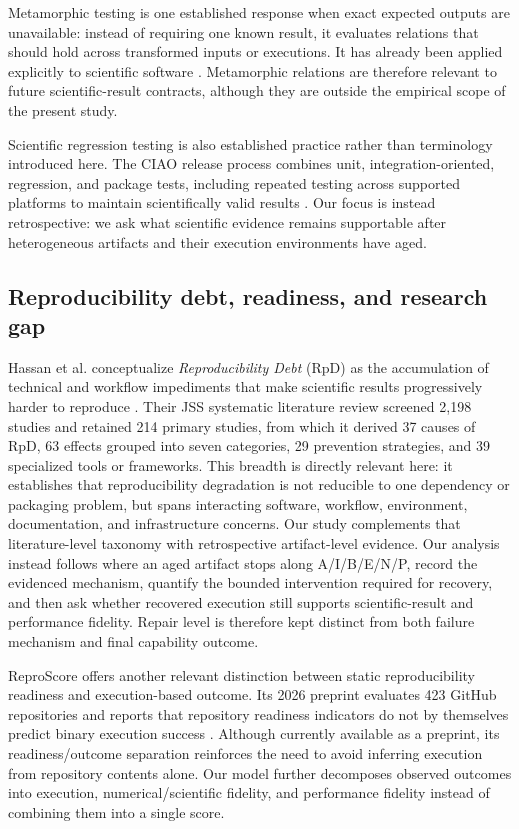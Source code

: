 \documentclass[a4paper,fleqn]{cas-dc}
\begin{document}
Metamorphic testing is one established response when exact expected outputs are unavailable: instead of requiring one known result, it evaluates relations that should hold across transformed inputs or executions. It has already been applied explicitly to scientific software \citep{ding2016metamorphic}. Metamorphic relations are therefore relevant to future scientific-result contracts, although they are outside the empirical scope of the present study.

Scientific regression testing is also established practice rather than terminology introduced here. The CIAO release process combines unit, integration-oriented, regression, and package tests, including repeated testing across supported platforms to maintain scientifically valid results \citep{lee2011ciao}. Our focus is instead retrospective: we ask what scientific evidence remains supportable after heterogeneous artifacts and their execution environments have aged.

\subsection{Reproducibility debt, readiness, and research gap}

Hassan et al. conceptualize \emph{Reproducibility Debt} (RpD) as the accumulation of technical and workflow impediments that make scientific results progressively harder to reproduce \citep{hassan2025debt}. Their JSS systematic literature review screened 2,198 studies and retained 214 primary studies, from which it derived 37 causes of RpD, 63 effects grouped into seven categories, 29 prevention strategies, and 39 specialized tools or frameworks. This breadth is directly relevant here: it establishes that reproducibility degradation is not reducible to one dependency or packaging problem, but spans interacting software, workflow, environment, documentation, and infrastructure concerns. Our study complements that literature-level taxonomy with retrospective artifact-level evidence. Our analysis instead follows where an aged artifact stops along A/I/B/E/N/P, record the evidenced mechanism, quantify the bounded intervention required for recovery, and then ask whether recovered execution still supports scientific-result and performance fidelity. Repair level is therefore kept distinct from both failure mechanism and final capability outcome.

ReproScore offers another relevant distinction between static reproducibility readiness and execution-based outcome. Its 2026 preprint evaluates 423 GitHub repositories and reports that repository readiness indicators do not by themselves predict binary execution success \citep{samuel2026reproscore}. Although currently available as a preprint, its readiness/outcome separation reinforces the need to avoid inferring execution from repository contents alone. Our model further decomposes observed outcomes into execution, numerical/scientific fidelity, and performance fidelity instead of combining them into a single score.
\end{document}
